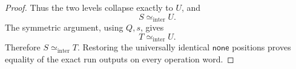 \documentclass[11pt]{article}
\begin{document}
\begin{proof}
Thus the two levels collapse exactly to $U$, and
\begin{equation}
S\simeq_{\mathrm{inter}}U.
\tag{20}
\end{equation}
The symmetric argument, using $Q,s$, gives
\begin{equation}
T\simeq_{\mathrm{inter}}U.
\tag{21}
\end{equation}
Therefore $S\simeq_{\mathrm{inter}}T$.  Restoring the universally identical $\mathsf{none}$ positions proves equality of the exact run outputs on every operation word.
\end{proof}
\end{document}
